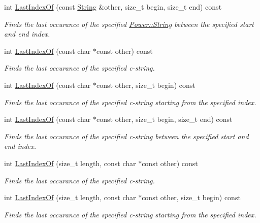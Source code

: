 \begin{DoxyCompactItemize}
int \hyperlink{class_power_1_1_string_ac22b55e02887c0087e3f07d22e91b542}{Last\+Index\+Of} (const \hyperlink{class_power_1_1_string}{String} \&other, size\+\_\+t begin, size\+\_\+t end) const
\begin{DoxyCompactList}\small\item\em Finds the last occurance of the specified \hyperlink{class_power_1_1_string}{Power\+::\+String} between the specified start and end index. \end{DoxyCompactList}\item 
int \hyperlink{class_power_1_1_string_ac48efb7e8ad6af8665b08cb2a3804dbc}{Last\+Index\+Of} (const char $\ast$const other) const
\begin{DoxyCompactList}\small\item\em Finds the last occurance of the specified c-\/string. \end{DoxyCompactList}\item 
int \hyperlink{class_power_1_1_string_a60a3c0874cb68c943e5c36192db3be02}{Last\+Index\+Of} (const char $\ast$const other, size\+\_\+t begin) const
\begin{DoxyCompactList}\small\item\em Finds the last occurance of the specified c-\/string starting from the specified index. \end{DoxyCompactList}\item 
int \hyperlink{class_power_1_1_string_afd049df94f7be6b64be4037a770b7b2d}{Last\+Index\+Of} (const char $\ast$const other, size\+\_\+t begin, size\+\_\+t end) const
\begin{DoxyCompactList}\small\item\em Finds the last occurance of the specified c-\/string between the specified start and end index. \end{DoxyCompactList}\item 
int \hyperlink{class_power_1_1_string_a9709f06b80356a5aa4f921f3b29162f1}{Last\+Index\+Of} (size\+\_\+t length, const char $\ast$const other) const
\begin{DoxyCompactList}\small\item\em Finds the last occurance of the specified c-\/string. \end{DoxyCompactList}\item 
int \hyperlink{class_power_1_1_string_a5ba9aa7b251309c1ec5c977f3148e93f}{Last\+Index\+Of} (size\+\_\+t length, const char $\ast$const other, size\+\_\+t begin) const
\begin{DoxyCompactList}\small\item\em Finds the last occurance of the specified c-\/string starting from the specified index. \end{DoxyCompactList}\item 

\end{DoxyCompactItemize}
